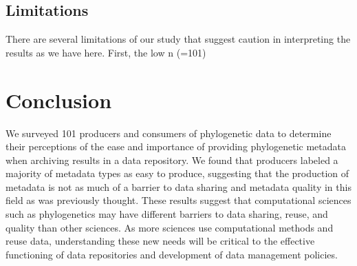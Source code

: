 \documentclass[12pt]{scrartcl}
\begin{document}
\begin{multicols}{2}
\subsection{Limitations}
There are several limitations of our study that suggest caution in interpreting the results as we have here.  First, the low n (=101)

\section{Conclusion}

We surveyed 101 producers and consumers of phylogenetic data to determine their perceptions of the ease and importance of providing phylogenetic metadata when archiving results in a data repository.  We found that producers labeled a majority of metadata types as easy to produce, suggesting that the production of metadata is not as much of a barrier to data sharing and metadata quality in this field as was previously thought.  
These results suggest that computational sciences such as phylogenetics may have different barriers to data sharing, reuse, and quality than other sciences.  As more sciences use computational methods and reuse data, understanding these new needs will be critical to the effective functioning of data repositories and development of data management policies.



\end{multicols}
\end{document}
